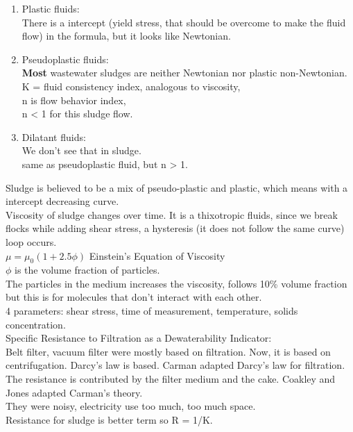 \documentclass[12pt]{article}
\begin{document}
 \begin{enumerate}
     \item Plastic fluids:\\
     There is a intercept (yield stress, that should be overcome to make the fluid flow) in the formula, but it looks like Newtonian.
     \item Pseudoplastic fluids:\\
     \textbf{Most} wastewater sludges are neither Newtonian nor plastic non-Newtonian.\\
    K = fluid consistency index, analogous to viscosity,\\
    n is flow behavior index,\\
    n < 1 for this sludge flow.
    \item Dilatant fluids:\\
    We don't see that in sludge.\\
    same as pseudoplastic fluid, but
    n > 1.
 \end{enumerate}
Sludge is believed to be a mix of pseudo-plastic and plastic, which means with a intercept decreasing curve.\\
Viscosity of sludge changes over time. It is a thixotropic fluids, since we break flocks while adding shear stress, a hysteresis (it does not follow the same curve) loop occurs.\\
$\mu = \mu_0(1+2.5\phi)$ Einstein's Equation of Viscosity\\
$\phi$ is the volume fraction of particles.\\
The particles in the medium increases the viscosity, follows 10\% volume fraction but this is for molecules that don't interact with each other.\\
4 parameters: shear stress, time of measurement, temperature, solids concentration.\\
Specific Resistance to Filtration as a Dewaterability Indicator:\\
Belt filter, vacuum filter were mostly based on filtration.
Now, it is based on centrifugation.
Darcy's law is based. %
Carman adapted Darcy's law for filtration.\\ %
The resistance is contributed by the filter medium and the cake.
Coakley and Jones adapted Carman's theory.\\
They were noisy, electricity use too much, too much space.\\
Resistance for sludge is better term so R = 1/K.\\
\end{document}
